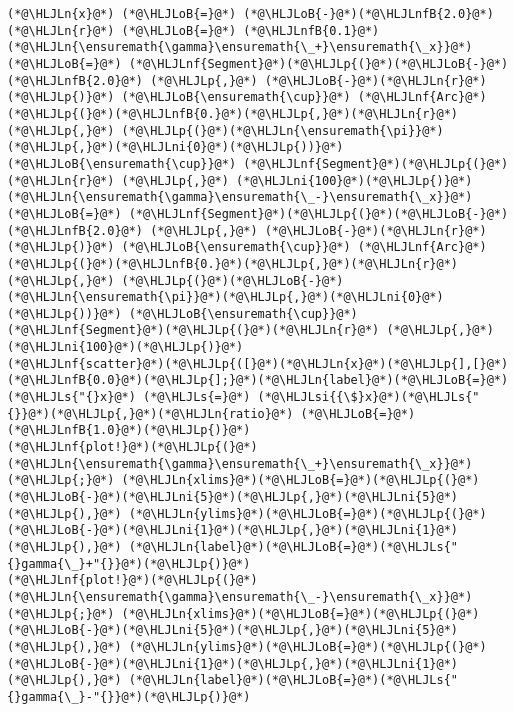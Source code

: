 \documentclass[12pt,a4paper]{article}
\newcommand{\HLJLn}[1]{#1}
\newcommand{\HLJLnf}[1]{\textcolor[RGB]{66,102,213}{#1}}
\newcommand{\HLJLs}[1]{\textcolor[RGB]{201,61,57}{#1}}
\newcommand{\HLJLsi}[1]{#1}
\newcommand{\HLJLnfB}[1]{\textcolor[RGB]{59,151,46}{#1}}
\newcommand{\HLJLni}[1]{\textcolor[RGB]{59,151,46}{#1}}
\newcommand{\HLJLoB}[1]{\textcolor[RGB]{102,102,102}{\textbf{#1}}}
\newcommand{\HLJLp}[1]{#1}
\begin{document}
\begin{lstlisting}
(*@\HLJLn{x}@*) (*@\HLJLoB{=}@*) (*@\HLJLoB{-}@*)(*@\HLJLnfB{2.0}@*)
(*@\HLJLn{r}@*) (*@\HLJLoB{=}@*) (*@\HLJLnfB{0.1}@*)
(*@\HLJLn{\ensuremath{\gamma}\ensuremath{\_+}\ensuremath{\_x}}@*) (*@\HLJLoB{=}@*) (*@\HLJLnf{Segment}@*)(*@\HLJLp{(}@*)(*@\HLJLoB{-}@*)(*@\HLJLnfB{2.0}@*) (*@\HLJLp{,}@*) (*@\HLJLoB{-}@*)(*@\HLJLn{r}@*)(*@\HLJLp{)}@*) (*@\HLJLoB{\ensuremath{\cup}}@*) (*@\HLJLnf{Arc}@*)(*@\HLJLp{(}@*)(*@\HLJLnfB{0.}@*)(*@\HLJLp{,}@*)(*@\HLJLn{r}@*)(*@\HLJLp{,}@*) (*@\HLJLp{(}@*)(*@\HLJLn{\ensuremath{\pi}}@*)(*@\HLJLp{,}@*)(*@\HLJLni{0}@*)(*@\HLJLp{))}@*) (*@\HLJLoB{\ensuremath{\cup}}@*) (*@\HLJLnf{Segment}@*)(*@\HLJLp{(}@*)(*@\HLJLn{r}@*) (*@\HLJLp{,}@*) (*@\HLJLni{100}@*)(*@\HLJLp{)}@*)
(*@\HLJLn{\ensuremath{\gamma}\ensuremath{\_-}\ensuremath{\_x}}@*) (*@\HLJLoB{=}@*) (*@\HLJLnf{Segment}@*)(*@\HLJLp{(}@*)(*@\HLJLoB{-}@*)(*@\HLJLnfB{2.0}@*) (*@\HLJLp{,}@*) (*@\HLJLoB{-}@*)(*@\HLJLn{r}@*)(*@\HLJLp{)}@*) (*@\HLJLoB{\ensuremath{\cup}}@*) (*@\HLJLnf{Arc}@*)(*@\HLJLp{(}@*)(*@\HLJLnfB{0.}@*)(*@\HLJLp{,}@*)(*@\HLJLn{r}@*)(*@\HLJLp{,}@*) (*@\HLJLp{(}@*)(*@\HLJLoB{-}@*)(*@\HLJLn{\ensuremath{\pi}}@*)(*@\HLJLp{,}@*)(*@\HLJLni{0}@*)(*@\HLJLp{))}@*) (*@\HLJLoB{\ensuremath{\cup}}@*) (*@\HLJLnf{Segment}@*)(*@\HLJLp{(}@*)(*@\HLJLn{r}@*) (*@\HLJLp{,}@*) (*@\HLJLni{100}@*)(*@\HLJLp{)}@*)
(*@\HLJLnf{scatter}@*)(*@\HLJLp{([}@*)(*@\HLJLn{x}@*)(*@\HLJLp{],[}@*)(*@\HLJLnfB{0.0}@*)(*@\HLJLp{];}@*)(*@\HLJLn{label}@*)(*@\HLJLoB{=}@*)(*@\HLJLs{"{}x}@*) (*@\HLJLs{=}@*) (*@\HLJLsi{{\$}x}@*)(*@\HLJLs{"{}}@*)(*@\HLJLp{,}@*)(*@\HLJLn{ratio}@*) (*@\HLJLoB{=}@*) (*@\HLJLnfB{1.0}@*)(*@\HLJLp{)}@*)
(*@\HLJLnf{plot!}@*)(*@\HLJLp{(}@*)(*@\HLJLn{\ensuremath{\gamma}\ensuremath{\_+}\ensuremath{\_x}}@*) (*@\HLJLp{;}@*) (*@\HLJLn{xlims}@*)(*@\HLJLoB{=}@*)(*@\HLJLp{(}@*)(*@\HLJLoB{-}@*)(*@\HLJLni{5}@*)(*@\HLJLp{,}@*)(*@\HLJLni{5}@*)(*@\HLJLp{),}@*) (*@\HLJLn{ylims}@*)(*@\HLJLoB{=}@*)(*@\HLJLp{(}@*)(*@\HLJLoB{-}@*)(*@\HLJLni{1}@*)(*@\HLJLp{,}@*)(*@\HLJLni{1}@*)(*@\HLJLp{),}@*) (*@\HLJLn{label}@*)(*@\HLJLoB{=}@*)(*@\HLJLs{"{}gamma{\_}+"{}}@*)(*@\HLJLp{)}@*)
(*@\HLJLnf{plot!}@*)(*@\HLJLp{(}@*)(*@\HLJLn{\ensuremath{\gamma}\ensuremath{\_-}\ensuremath{\_x}}@*)(*@\HLJLp{;}@*) (*@\HLJLn{xlims}@*)(*@\HLJLoB{=}@*)(*@\HLJLp{(}@*)(*@\HLJLoB{-}@*)(*@\HLJLni{5}@*)(*@\HLJLp{,}@*)(*@\HLJLni{5}@*)(*@\HLJLp{),}@*) (*@\HLJLn{ylims}@*)(*@\HLJLoB{=}@*)(*@\HLJLp{(}@*)(*@\HLJLoB{-}@*)(*@\HLJLni{1}@*)(*@\HLJLp{,}@*)(*@\HLJLni{1}@*)(*@\HLJLp{),}@*) (*@\HLJLn{label}@*)(*@\HLJLoB{=}@*)(*@\HLJLs{"{}gamma{\_}-"{}}@*)(*@\HLJLp{)}@*)
\end{lstlisting}
\end{document}
